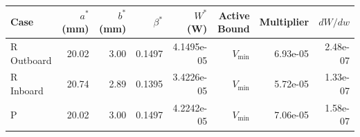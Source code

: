 \begin{tabular}{lrrrrrrr}
\toprule
Case & $a^*$ (mm) & $b^*$ (mm) & $\beta^*$ & $W^*$ (W) & Active Bound & Multiplier & $dW/dw$ \\
\midrule
R Outboard & 20.02 & 3.00 & 0.1497 & 4.1495e-05 & $V_\mathrm{min}$ & 6.93e-05 & 2.48e-07 \\
R Inboard & 20.74 & 2.89 & 0.1395 & 3.4226e-05 & $V_\mathrm{min}$ & 5.72e-05 & 1.33e-07 \\
P & 20.02 & 3.00 & 0.1497 & 4.2242e-05 & $V_\mathrm{min}$ & 7.06e-05 & 1.58e-07 \\
\bottomrule
\end{tabular}
